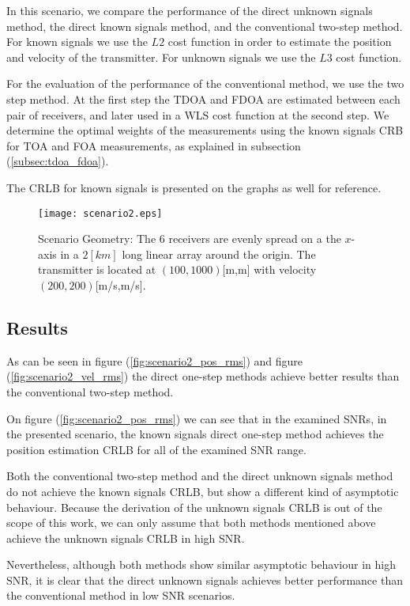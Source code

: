 In this scenario, we compare the performance of the direct unknown signals method, the direct known signals method, and the conventional two-step method.
For known signals we use the $L2$ cost function in order to estimate the position and velocity of the transmitter. For unknown signals we use the $L3$ cost function.

For the evaluation of the performance of the conventional method, we use the two step method.
At the first step the TDOA and FDOA are estimated between each pair of receivers, and later used in a WLS cost function at the second step. We determine the optimal weights of the measurements using the known signals CRB for TOA and FOA measurements, as explained in subsection (\ref{subsec:tdoa_fdoa}).

The CRLB for known signals is presented on the graphs as well for reference.

\begin{figure}
\begin{center}
\texttt{[image: scenario2.eps]} 
\end{center}
\caption{Scenario Geometry: The 6 receivers are evenly spread on a the $x$-axis in a $2[km]$ long linear array around the origin. The transmitter is located at $(100,1000)$[m,m] with velocity $(200,200)$[m/s,m/s].}
\label{fig:scenario2_geometry}
\end{figure}


\subsection*{Results}
As can be seen in figure (\ref{fig:scenario2_pos_rms}) and figure (\ref{fig:scenario2_vel_rms}) the direct one-step methods achieve better results than the conventional two-step method.

On figure (\ref{fig:scenario2_pos_rms}) we can see that in the examined SNRs, in the presented scenario, the known signals direct one-step method achieves the position estimation CRLB for all of the examined SNR range.

Both the conventional two-step method and the direct unknown signals method do not achieve the known signals CRLB, but show a different kind of asymptotic behaviour. Because the derivation of the unknown signals CRLB is out of the scope of this work, we can only assume that both methods mentioned above achieve the unknown signals CRLB in high SNR. 

Nevertheless, although both methods show similar asymptotic behaviour in high SNR, it is clear that the direct unknown signals achieves better performance than the conventional method in low SNR scenarios.

